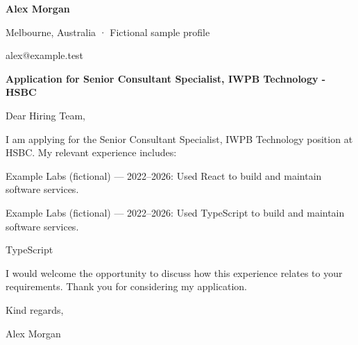 \documentclass[10pt,a4paper]{article}
\begin{document}
{\LARGE\bfseries\color{navy} Alex Morgan}\par
Melbourne, Australia · Fictional sample profile\par
alex@example.test\par
{\large\bfseries\color{navy} Application for Senior Consultant Specialist, IWPB Technology - HSBC}\par
Dear Hiring Team,\par
I am applying for the Senior Consultant Specialist, IWPB Technology position at HSBC. My relevant experience includes:\par
Example Labs (fictional) — 2022–2026: Used React to build and maintain software services.\par
Example Labs (fictional) — 2022–2026: Used TypeScript to build and maintain software services.\par
TypeScript\par
I would welcome the opportunity to discuss how this experience relates to your requirements. Thank you for considering my application.\par
Kind regards,\par
Alex Morgan\par
\end{document}
